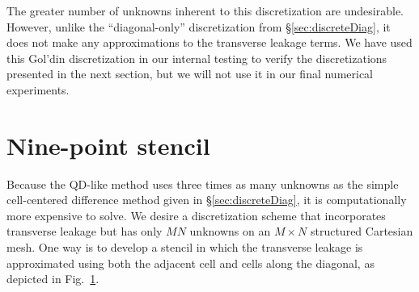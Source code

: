The greater number of unknowns inherent to this discretization are undesirable.
However, unlike the ``diagonal-only'' discretization from
\S\ref{sec:discreteDiag}, it does not make any approximations to the transverse
leakage terms. We have used this Gol'din discretization in our internal testing
to verify the discretizations presented in the next section, but we will not
use it in our final numerical experiments.

\section{Nine-point stencil}

Because the QD-like method uses three times as many unknowns as the simple
cell-centered difference method given in \S\ref{sec:discreteDiag}, it is
computationally more expensive to solve. We desire a discretization scheme that
incorporates transverse leakage but has only $MN$ unknowns on an $M\times N$
structured Cartesian mesh. One way is to develop a stencil in which the
transverse
leakage is approximated using both the adjacent cell and cells along the
diagonal, as depicted in Fig.~\ref{fig:anisoStencils}.

\begin{figure}[b]
  \centering
  \label{fig:anisoStencils}
\end{figure}

